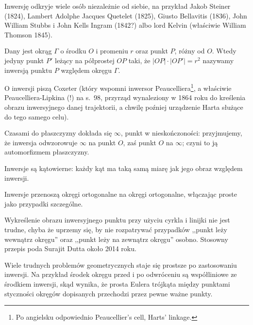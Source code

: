 Inwersję odkryje wiele osób niezależnie od siebie, na przykład Jakob Steiner (1824), Lambert Adolphe Jacques Quetelet (1825), Giusto Bellavitis (1836), John William Stubbs i John Kells Ingram (1842?) albo lord Kelvin (właściwie William Thomson 1845).

\begin{definition}
    Dany jest okrąg $\Gamma$ o środku $O$ i promeniu $r$ oraz punkt $P$, różny od $O$.
    Wtedy jedyny punkt $P'$ leżący na półprostej $OP$ taki, że $|OP| \cdot |OP'| = r^2$ nazywamy inwersją punktu $P$ względem okręgu $\Gamma$.
\end{definition}

O inwersji piszą Coxeter \cite[s. 93-101, 107-112]{coxeter_1967} (który wspomni inwersor Peaucelliera\footnote{Po angielsku odpowiednio Peaucellier's cell, Harts' linkage.}, a właściwie Peaucelliera-Lipkina (!) na s.~98, przyrząd wynaleziony w 1864 roku do kreślenia obrazu inwersyjnego danej trajektorii, a chwilę poźniej urządzenie Harta służące do tego samego celu).

Czasami do płaszczyzny dokłada się $\infty$, punkt w nieskończoności: przyjmujemy, że inwersja odwzorowuje $\infty$ na punkt $O$, zaś punkt $O$ na $\infty$; czyni to ją automorfizmem płaszczyzny.

\begin{proposition}
    Inwersje są kątowierne: każdy kąt ma taką samą miarę jak jego obraz względem inwersji.
\end{proposition}

\begin{proposition}
    Inwersje przenoszą okręgi ortogonalne na okręgi ortogonalne, włączając proste jako przypadki szczególne.
\end{proposition}

Wykreślenie obrazu inwersyjnego punktu przy użyciu cyrkla i linijki nie jest trudne, chyba że uprzemy się, by nie rozpatrywać przypadków ,,punkt leży wewnątrz okręgu'' oraz ,,punkt leży na zewnątrz okręgu'' osobno.
Stosowny przepis poda Surajit Dutta około 2014 roku.
%

Wiele trudnych problemów geometrycznych staje się prostsze po zastosowaniu inwersji.
Na przykład środek okręgu przed i po odwróceniu są współliniowe ze środkiem inwersji, skąd wynika, że prosta Eulera trójkąta między punktami styczności okręgów dopisanych przechodzi przez pewne ważne punkty.

